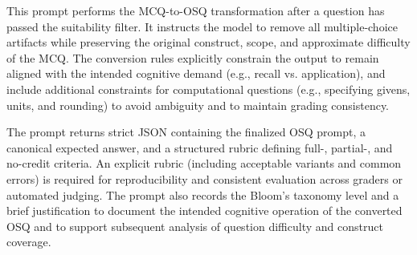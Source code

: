 This prompt performs the MCQ-to-OSQ transformation after a question has passed the suitability filter. It instructs the model to remove all multiple-choice artifacts while preserving the original construct, scope, and approximate difficulty of the MCQ. The conversion rules explicitly constrain the output to remain aligned with the intended cognitive demand (e.g., recall vs. application), and include additional constraints for computational questions (e.g., specifying givens, units, and rounding) to avoid ambiguity and to maintain grading consistency.

The prompt returns strict JSON containing the finalized OSQ prompt, a canonical expected answer, and a structured rubric defining full-, partial-, and no-credit criteria. An explicit rubric (including acceptable variants and common errors) is required for reproducibility and consistent evaluation across graders or automated judging. The prompt also records the Bloom’s taxonomy level and a brief justification to document the intended cognitive operation of the converted OSQ and to support subsequent analysis of question difficulty and construct coverage.

